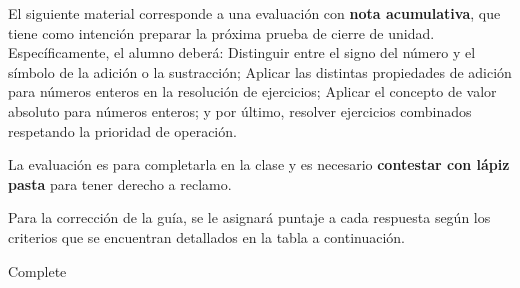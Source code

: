 \documentclass{prueba}
\begin{document}

El siguiente material corresponde a una evaluación con {\bfseries nota acumulativa}, que 
tiene como intención preparar la próxima prueba de cierre de unidad. Específicamente,
el alumno deberá: Distinguir entre el signo del número y el símbolo de la adición o la
sustracción; Aplicar las distintas propiedades de adición para números enteros en 
la resolución de ejercicios;
Aplicar el concepto de valor absoluto para números enteros; y por último, 
resolver ejercicios combinados respetando la prioridad de operación.

La evaluación es para completarla en la clase y es necesario {\bfseries contestar con lápiz pasta}
para tener derecho a reclamo.


\lipsum[1]


Para la corrección de la guía, se le asignará puntaje a cada respuesta según los criterios
que se encuentran detallados en la tabla a continuación.

\pauta
\newpage

\parte{} Complete 
\end{document}
